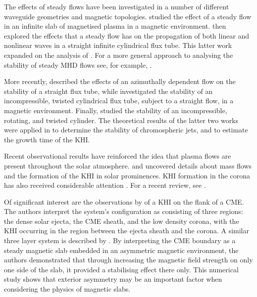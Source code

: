 The effects of steady flows have been investigated in a number of different waveguide geometries and magnetic topologies.
\cite{Nakariakov1995} studied the effect of a steady flow in an infinite slab of magnetised plasma in a magnetic environment.
\cite{Terra-Homem2003} then explored the effects that a steady flow has on the propagation of both linear and nonlinear waves in a straight infinite cylindrical flux tube.
This latter work expanded on the analysis of \cite{Somasundaram1999}.
For a more general approach to analysing the stability of steady MHD flows see, for example, \cite{Goedbloed2009a, Goedbloed2009b}.

More recently, \cite{Soler2010} described the effects of an azimuthally dependent flow on the stability of a straight flux tube, while \cite{Zaqarashvili2014} investigated the stability of an incompressible, twisted cylindrical flux tube, subject to a straight flow, in a magnetic environment.
Finally, \cite{Zaqarashvili2015} studied the stability of an incompressible, rotating, and twisted cylinder.
The theoretical results of the latter two works were applied in \cite{Kuridze2016} to determine the stability of chromospheric jets, and to estimate the growth time of the KHI.

Recent observational results have reinforced the idea that plasma flows are present throughout the solar atmosphere.
\cite{Berger2010} and \cite{Ryutova2010} uncovered details about mass flows and the formation of the KHI in solar prominences.
KHI formation in the corona has also received considerable attention \citep[see][]{Foullon2011, Ofman2011, Foullon2013}.
For a recent review, see \cite{Zhelyazkov2015}.

Of significant interest are the observations by \cite{Foullon2011} of a KHI on the flank of a CME.
The authors interpret the system's configuration as consisting of three regions: the dense solar ejecta, the CME sheath, and the low density corona, with the KHI occurring in the region between the ejecta sheath and the corona.
A similar three layer system is described by \cite{Mostl2013}.
By interpreting the CME boundary as a steady magnetic slab embedded in an asymmetric magnetic environment, the authors demonstrated that through increasing the magnetic field strength on only one side of the slab, it provided a stabilising effect there only.
This numerical study shows that exterior asymmetry may be an important factor when considering the physics of magnetic slabs.

